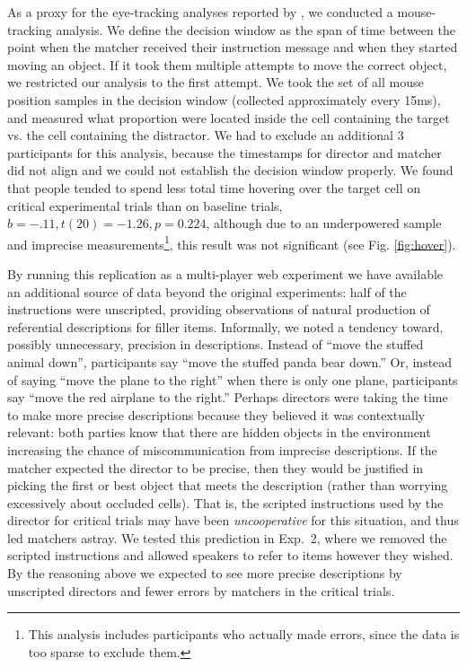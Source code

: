 \documentclass[10pt,letterpaper]{article}
\begin{document}
As a proxy for the eye-tracking analyses reported by , we conducted a mouse-tracking analysis. We define the decision window as the span of time between the point when the matcher received their instruction message and when they started moving an object. If it took them multiple attempts to move the correct object, we restricted our analysis to the first attempt. We took the set of all mouse position samples in the decision window (collected approximately every 15ms), and measured what proportion were located inside the cell containing the target vs. the cell containing the distractor.  We had to exclude an additional 3 participants for this analysis, because the timestamps for director and matcher did not align and we could not establish the decision window properly.
We found that people tended to spend less total time hovering over the target cell on critical experimental trials than on baseline trials, $b = -.11, t(20) = -1.26, p = 0.224$, although due to an underpowered sample and imprecise measurements\footnote{This analysis includes participants who actually made errors, since the data is too sparse to exclude them.}, this result was not significant (see Fig. \ref{fig:hover}). %

By running this replication as a multi-player web experiment we have available an additional source of data beyond the original experiments: half of the instructions were unscripted, providing observations of natural production of referential descriptions for filler items. 
Informally, we noted a tendency toward, possibly unnecessary, precision in descriptions. Instead of ``move the stuffed animal down'', participants say ``move the stuffed panda bear down.'' Or, instead of saying ``move the plane to the right'' when there is only one plane, participants say ``move the red airplane to the right.'' 
Perhaps directors were taking the time to make more precise descriptions because they believed it was contextually relevant: both parties know that there are hidden objects in the environment increasing the chance of miscommunication from imprecise descriptions. 
If the matcher expected the director to be precise, then they would be justified in picking the first or best object that meets the description (rather than worrying excessively about occluded cells). 
That is, the scripted instructions used by the director for critical trials may have been \emph{uncooperative} for this situation, and thus led matchers astray. 
We tested this prediction in Exp.~2, where we removed the scripted instructions and allowed speakers to refer to items however they wished.
By the reasoning above we expected to see more precise descriptions by unscripted directors and fewer errors by matchers in the critical trials.
\end{document}
